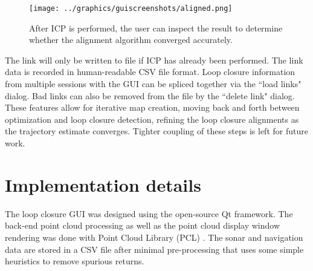  \begin{figure}[htbp]
   \centering
   \texttt{[image: ../graphics/guiscreenshots/aligned.png]} %
   \caption{After ICP is performed, the user can inspect the result to determine whether the alignment algorithm converged accurately.}
   \label{fig:GUI_poseicp}
\end{figure}

The link will only be written to file if ICP has already been performed. The link data is recorded in human-readable CSV file format. Loop closure information from multiple sessions with the GUI can be spliced together via the ``load links" dialog. Bad links can also be removed from the file by the ``delete link" dialog. These features allow for iterative map creation, moving back and forth between optimization and loop closure detection, refining the loop closure alignments as the trajectory estimate converges. Tighter coupling of these steps is left for future work.

\section{Implementation details}

The loop closure GUI was designed using the open-source Qt framework. The back-end point cloud processing as well as the point cloud display window rendering was done with Point Cloud Library (PCL) \cite{Rusu2011}.  The sonar and navigation data are stored in a CSV file after minimal pre-processing that uses some simple heuristics to remove spurious returns.
